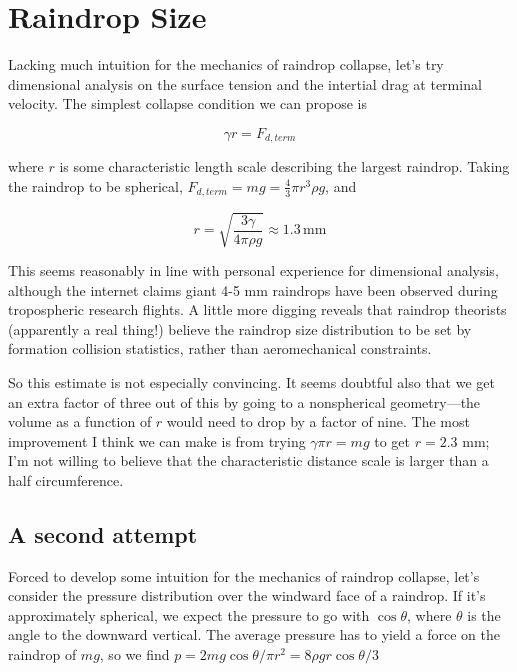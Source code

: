 \documentclass[12pt]{article}
\begin{document}





\section{Raindrop Size}

Lacking much intuition for the mechanics of raindrop collapse, let's try dimensional analysis on the surface tension and the intertial drag at terminal velocity. The simplest collapse condition we can propose is 

\[ \gamma r = F_{d,term}
\]

where \(r\) is some characteristic length scale describing the largest raindrop. Taking the raindrop to be spherical, \(F_{d,term} = mg = \frac{4}{3}\pi r^3 \rho g\), and

\[ r = \sqrt{\frac{3\gamma}{4\pi\rho g}} \approx 1.3 \, \mathrm{mm}
\]

This seems reasonably in line with personal experience for dimensional analysis, although the internet claims giant 4-5 mm raindrops have been observed during tropospheric research flights. A little more digging reveals that raindrop theorists (apparently a real thing!) believe the raindrop size distribution to be set by formation collision statistics, rather than aeromechanical constraints.

So this estimate is not especially convincing. It seems doubtful also that we get an extra factor of three out of this by going to a nonspherical geometry---the volume as a function of \(r\) would need to drop by a factor of nine. The most improvement I think we can make is from trying \(\gamma \pi r = mg\) to get \(r=2.3\) mm; I'm not willing to believe that the characteristic distance scale is larger than a half circumference. 

\subsection{A second attempt}

Forced to develop some intuition for the mechanics of raindrop collapse, let's consider the pressure distribution over the windward face of a raindrop. If it's approximately spherical, we expect the pressure to go with \(\cos\theta\), where \(\theta\) is the angle to the downward vertical. The average pressure has to yield a force on the raindrop of \(mg\), so we find \(p = 2mg\cos\theta/\pi r^2 = 8\rho g r \cos\theta/3\)
\end{document}
